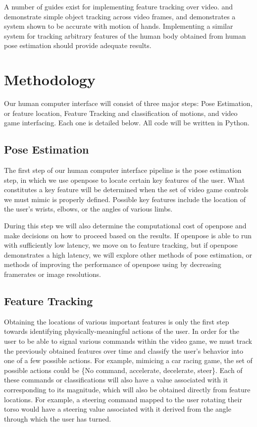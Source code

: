 \documentclass[10pt,twocolumn,letterpaper]{article}
\begin{document}
A number of guides exist for implementing feature tracking over video. \cite{tracking_1} 
and \cite{tracking_2} demonstrate simple object tracking across video frames, and \cite{tracking_2} 
demonstrates a system shown to be accurate with motion of hands. Implementing a similar system for 
tracking arbitrary features of the human body obtained from human pose estimation should provide 
adequate results.

\section{Methodology}
Our human computer interface will consist of three major steps: Pose Estimation, or feature 
location, Feature Tracking and classification of motions, and video game interfacing. Each one 
is detailed below. All code will be written in Python.

\subsection{Pose Estimation}
The first step of our human computer interface pipeline is the pose estimation step, in which 
we use openpose to locate certain key features of the user. What constitutes a key feature will 
be determined when the set of video game controls we must mimic is properly defined. Possible 
key features include the location of the user's wrists, elbows, or the angles of various limbs. 

During this step we will also determine the computational cost of openpose and make decisions on 
how to proceed based on the results. If openpose is able to run with sufficiently low latency, we 
move on to feature tracking, but if openpose demonstrates a high latency, we will explore other 
methods of pose estimation, or methods of improving the performance of openpose using by decreasing 
framerates or image resolutions.

\subsection{Feature Tracking}
Obtaining the locations of various important features is only the first step towards identifying 
physically-meaningful actions of the user. In order for the user to be able to signal various 
commands within the video game, we must track the previously obtained features over time and 
classify the user's behavior into one of a few possible actions. For example, mimicing a car 
racing game, the set of possible actions could be \{No command, accelerate, decelerate, steer\}. 
Each of these commands or classifications will also have a value associated with it corresponding 
to its magnitude, which will also be obtained directly from feature locations. For example, a steering 
command mapped to the user rotating their torso would have a steering value associated with it 
derived from the angle through which the user has turned. 
\end{document}
